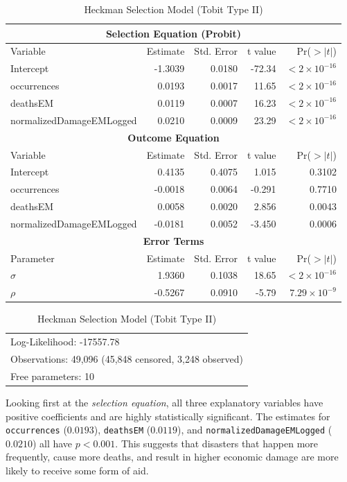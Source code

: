 \documentclass[12pt,letterpaper]{article}
\begin{document}
 \begin{table}[htbp]
 	\centering
 	\caption{Heckman Selection Model (Tobit Type II)}
 	\begin{tabular}{lrrrr}
 		\hline
 		\multicolumn{5}{c}{\textbf{Selection Equation (Probit)}} \\
 		\hline
 		Variable & Estimate & Std. Error & t value & Pr($>|t|$) \\
 		\hline
 		Intercept & -1.3039 & 0.0180 & -72.34 & $<2\times10^{-16}$ \\
 		occurrences & 0.0193 & 0.0017 & 11.65 & $<2\times10^{-16}$ \\
 		deathsEM & 0.0119 & 0.0007 & 16.23 & $<2\times10^{-16}$ \\
 		normalizedDamageEMLogged & 0.0210 & 0.0009 & 23.29 & $<2\times10^{-16}$ \\
 		\hline
 		\multicolumn{5}{c}{\textbf{Outcome Equation}} \\
 		\hline
 		Variable & Estimate & Std. Error & t value & Pr($>|t|$) \\
 		\hline
 		Intercept & 0.4135 & 0.4075 & 1.015 & 0.3102 \\
 		occurrences & -0.0018 & 0.0064 & -0.291 & 0.7710 \\
 		deathsEM & 0.0058 & 0.0020 & 2.856 & 0.0043 \\
 		normalizedDamageEMLogged & -0.0181 & 0.0052 & -3.450 & 0.0006 \\
 		\hline
 		\multicolumn{5}{c}{\textbf{Error Terms}} \\
 		\hline
 		Parameter & Estimate & Std. Error & t value & Pr($>|t|$) \\
 		\hline
 		$\sigma$ & 1.9360 & 0.1038 & 18.65 & $<2\times10^{-16}$ \\
 		$\rho$ & -0.5267 & 0.0910 & -5.79 & $7.29\times10^{-9}$ \\
 		\hline
 	\end{tabular}
 	
 	\vspace{0.5cm}
 	
 	\begin{tabular}{l}
 		Log-Likelihood: -17557.78 \\
 		Observations: 49,096 (45,848 censored, 3,248 observed) \\
 		Free parameters: 10 \\
 	\end{tabular}
 	
 \end{table}
 
 \noindent Looking first at the \textit{selection equation}, all three explanatory variables have positive coefficients and are highly statistically significant. The estimates for \texttt{occurrences} (\(0.0193\)), \texttt{deathsEM} (\(0.0119\)), and \texttt{normalizedDamageEMLogged} (\(0.0210\)) all have \(p < 0.001\). This suggests that disasters that happen more frequently, cause more deaths, and result in higher economic damage are more likely to receive some form of aid.\\
 
\end{document}
